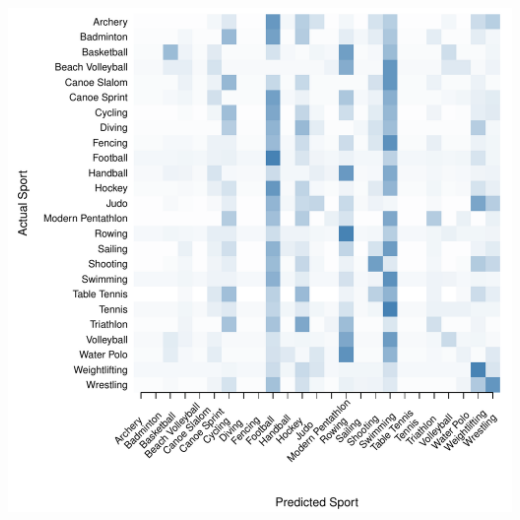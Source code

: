 \documentclass[landscape, paperwidth=42in, paperheight=36in,
fontscale=.35, margin=1in]{baposter}
\begin{document}
\begin{poster}
{\begin{center}
\begin{minipage}{0.45\textwidth}
\begin{center}
      \includegraphics[scale=0.27]{../graphics/sportCIT-tst.pdf}
    \end{center}
  \end{minipage}



\end{center}}
\end{poster}
\end{document}
